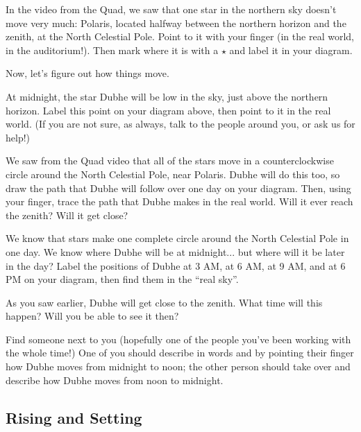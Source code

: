 \documentclass[12pt]{article}
\newcommand{\insp}{\vspace{1in}}
\begin{document}
In the video from the Quad, we saw that one star in the northern sky doesn't move very much: Polaris, located halfway between the northern horizon and the zenith, at the North Celestial Pole. Point to it with your finger (in the real world, in the auditorium!). Then mark where it is with a $\star$ and label it in your diagram.

\insp

Now, let's figure out how things move.

At midnight, the star Dubhe will be low in the sky, just above the northern horizon. Label this point on your diagram above, then point to it in the real world. (If you are not sure, as always, talk to the people around you, or ask us for help!)

\vspace{0.7in}

We saw from the Quad video that all of the stars move in a counterclockwise circle around the North Celestial Pole, near Polaris. Dubhe will do this too, so draw the path that Dubhe will follow over one day on your diagram. Then, using your finger, trace the path that Dubhe makes in the real world. Will it ever reach the zenith? Will it get close?

\vspace{0.7in}

We know that stars make one complete circle around the North Celestial Pole in one day. We know where Dubhe will be at midnight... but where will it be later in the day? Label the positions of Dubhe at 3 AM, at 6 AM, at 9 AM, and at 6 PM on your diagram, then find them in the ``real sky''.

\vspace{0.7in}

As you saw earlier, Dubhe will get close to the zenith. What time will this happen? Will you be able to see it then?

\vspace{0.7in}

Find someone next to you (hopefully one of the people you've been working with the whole time!) One of you should describe in words and by pointing their finger how Dubhe moves from midnight to noon; the other person should take over and describe how Dubhe moves from noon to midnight. 

\subsection{Rising and Setting}
\end{document}
